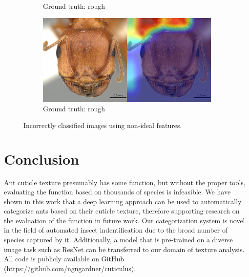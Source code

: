 \documentclass{aci}
\numberwithin{equation}{section}
\begin{document}
\begin{figure}
\begin{subfigure}{\subwidth}
        \caption{Ground truth: rough}
        \label{fig:incorrect_nonideal_61}
    \end{subfigure}
    \begin{subfigure}{\subwidth}
        \includegraphics[width=1\linewidth]{thesis_assets/gradcam/incorrect_nonideal/204.png}
        \caption{Ground truth: rough}
        \label{fig:incorrect_nonideal_204}
    \end{subfigure}
    \caption{Incorrectly classified images using non-ideal features.}
    \label{fig:incorrect_nonideal}
\end{figure}

\clearpage
\section{Conclusion}
Ant cuticle texture presumably has some function, but without the proper tools,
evaluating the function based on thousands of species is infeasible. We have
shown in this work that a deep learning approach can be used to automatically
categorize ants based on their cuticle texture, therefore supporting research on
the evaluation of the function in future work. Our categorization system is
novel in the field of automated insect indentification due to the broad number
of species captured by it. Additionally, a model that is pre-trained on a
diverse image task such as ResNet can be transferred to our domain of texture
analysis. All code is publicly available on GitHub
(https://github.com/ngngardner/cuticulus).



\end{document}
